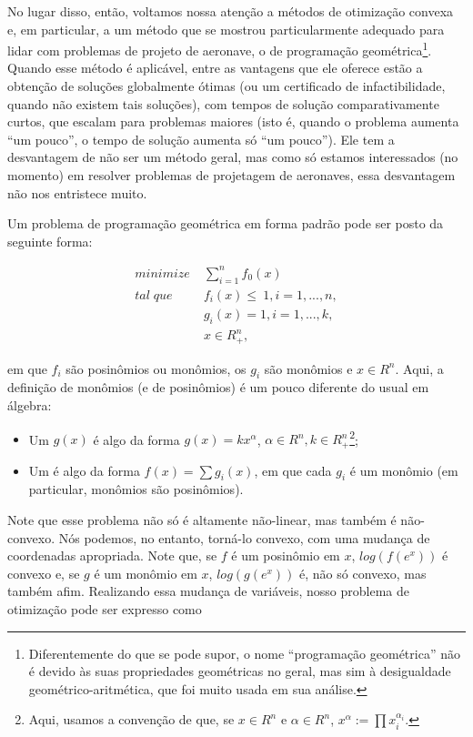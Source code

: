 No lugar disso, então, voltamos nossa atenção a métodos de otimização
convexa e, em particular, a um método que se mostrou particularmente
adequado para lidar com problemas de projeto de aeronave, o de
programação geométrica\footnote{Diferentemente do que se pode supor, o
  nome ``programação geométrica'' não é devido às suas propriedades
  geométricas no geral, mas sim à desigualdade geométrico-aritmética,
  que foi muito usada em sua análise.}. Quando esse método é
aplicável, entre as vantagens que ele oferece estão a obtenção de
soluções globalmente ótimas (ou um certificado de infactibilidade,
quando não existem tais soluções), com tempos de solução
comparativamente curtos, que escalam para problemas maiores (isto é,
quando o problema aumenta ``um pouco'', o tempo de solução aumenta só
``um pouco''). Ele tem a desvantagem de não ser um método geral, mas
como só estamos interessados (no momento) em resolver problemas de
projetagem de aeronaves, essa desvantagem não nos entristece muito.

Um problema de programação geométrica em forma padrão pode ser posto
da seguinte forma:

\begin{align*}
  minimize \;& \sum\limits_{i=1}^n f_0(x)\\ tal\; que\;& f_i(x) \leq\
  1, i = 1, ..., n,\\ & g_i(x) = 1, i = 1, ..., k,\\ & x \in R^n_{+},
\end{align*}

\noindent em que $f_i$ são posinômios ou monômios, os $g_i$ são
monômios e $x \in R^n$. Aqui, a definição de monômios (e de
posinômios) é um pouco diferente do usual em álgebra:

\begin{itemize}
\item Um  $g(x)$ é algo da forma $g(x) =
  kx^{\alpha}$, $\alpha \in R^n, k \in R^n_{+}$\footnote{Aqui, usamos
    a convenção de que, se $x \in R^n$ e $\alpha \in R^n$, $x^{\alpha}
    := \prod x_i^{\alpha_i}$.};
\item Um  é algo da forma $f(x) = \sum g_i(x)$,
  em que cada $g_i$ é um monômio (em particular, monômios são
  posinômios).
\end{itemize}

Note que esse problema não só é altamente não-linear, mas também é
não-convexo. Nós podemos, no entanto, torná-lo convexo, com uma
mudança de coordenadas apropriada. Note que, se $f$ é um posinômio em
$x$, $log(f(e^x))$ é convexo e, se $g$ é um monômio em $x$,
$log(g(e^x))$ é, não só convexo, mas também afim. Realizando essa
mudança de variáveis, nosso problema de otimização pode ser expresso
como


